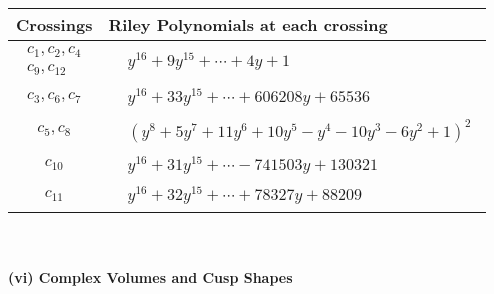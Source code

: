 \documentclass[1p]{elsarticle_modified}
\theoremstyle{definition}
\begin{document}
\begin{tabular}{m{50pt}|m{274pt}}
Crossings & \hspace{64pt}Riley Polynomials at each crossing \\
\hline $$\begin{aligned}c_{1},c_{2},c_{4}\\c_{9},c_{12}\end{aligned}$$&$\begin{aligned}
&y^{16}+9 y^{15}+\cdots+4 y+1
\end{aligned}$\\
\hline $$\begin{aligned}c_{3},c_{6},c_{7}\end{aligned}$$&$\begin{aligned}
&y^{16}+33 y^{15}+\cdots+606208 y+65536
\end{aligned}$\\
\hline $$\begin{aligned}c_{5},c_{8}\end{aligned}$$&$\begin{aligned}
&(y^8+5 y^7+11 y^6+10 y^5- y^4-10 y^3-6 y^2+1)^2
\end{aligned}$\\
\hline $$\begin{aligned}c_{10}\end{aligned}$$&$\begin{aligned}
&y^{16}+31 y^{15}+\cdots-741503 y+130321
\end{aligned}$\\
\hline $$\begin{aligned}c_{11}\end{aligned}$$&$\begin{aligned}
&y^{16}+32 y^{15}+\cdots+78327 y+88209
\end{aligned}$\\
\hline
\end{tabular}\\~\\
\newpage\flushleft \textbf{(vi) Complex Volumes and Cusp Shapes}
\end{document}
